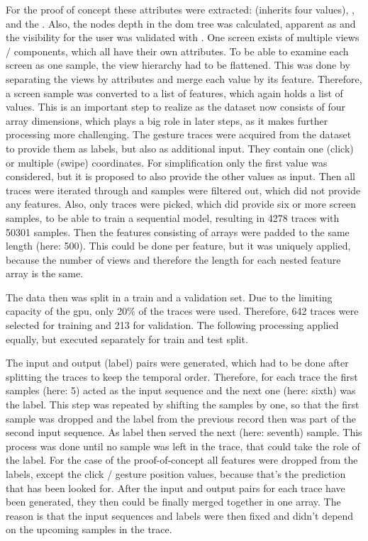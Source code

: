 For the proof of concept these attributes were extracted:  (inherits four values), ,  and the .
Also, the nodes depth in the dom tree was calculated, apparent as  and the visibility for the user was validated with .
One screen exists of multiple views / components, which all have their own attributes.
To be able to examine each screen as one sample, the view hierarchy had to be flattened.
This was done by separating the views by attributes and merge each value by its feature.
Therefore, a screen sample was converted to a list of features, which again holds a list of values.
This is an important step to realize as the dataset now consists of four array dimensions, which plays a big role in later steps, as it makes further processing more challenging.
The gesture traces were acquired from the dataset to provide them as labels, but also as additional input.
They contain one (click) or multiple (swipe) coordinates.
For simplification only the first value was considered, but it is proposed to also provide the other values as input.
Then all traces were iterated through and samples were filtered out, which did not provide any features.
Also, only traces were picked, which did provide six or more screen samples, to be able to train a sequential model, resulting in 4278 traces with 50301 samples.
Then the features consisting of arrays were padded to the same length (here: 500).
This could be done per feature, but it was uniquely applied, because the number of views and therefore the length for each nested feature array is the same.

The data then was split in a train and a validation set.
Due to the limiting capacity of the \gls{gpu}, only 20\% of the traces were used.
Therefore, 642 traces were selected for training and 213 for validation.
The following processing applied equally, but executed separately for train and test split.

The input and output (label) pairs were generated, which had to be done after splitting the traces to keep the temporal order.
Therefore, for each trace the first samples (here: 5) acted as the input sequence and the next one (here: sixth) was the label.
This step was repeated by shifting the samples by one, so that the first sample was dropped and the label from the previous record then was part of the second input sequence.
As label then served the next (here: seventh) sample.
This process was done until no sample was left in the trace, that could take the role of the label.
For the case of the proof-of-concept all features were dropped from the labels, except the click / gesture position values, because that's the prediction that has been looked for.
After the input and output pairs for each trace have been generated, they then could be finally merged together in one array.
The reason is that the input sequences and labels were then fixed and didn't depend on the upcoming samples in the trace.

